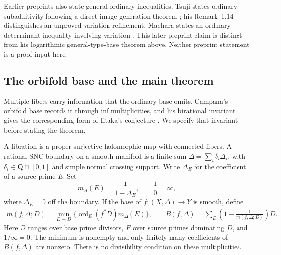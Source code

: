Earlier preprints also state general ordinary inequalities.
Tsuji states ordinary subadditivity following a direct-image generation
theorem \cite[Theorems~1.9 and~1.13]{TsujiDirectImages}; his
Remark~1.14 distinguishes an unproved variation refinement.
Maehara states an ordinary determinant inequality involving variation
\cite[\S7, Theorem~8]{MaeharaIitaka}. This later preprint claim is
distinct from his logarithmic general-type-base theorem above.
Neither preprint statement is a proof input here.

\subsection{The orbifold base and the main theorem}

Multiple fibers carry information that the ordinary base omits.
Campana's orbifold base records it through inf multiplicities, and
his birational invariant gives the corresponding form of Iitaka's
conjecture \cite{Campana2004,CampanaOrbifolds}. We specify that
invariant before stating the theorem.

\label{setup:orbifold-base}
A fibration is a proper surjective holomorphic map with connected
fibers. A rational SNC boundary on a smooth manifold is a finite
sum $\Delta=\sum_i\delta_i\Delta_i$, with
$\delta_i\in\mathbf Q\cap[0,1]$ and simple normal crossing support.
Write $\Delta_E$ for the coefficient of a source prime $E$. Set
\[
 m_\Delta(E)=\frac1{1-\Delta_E},
 \qquad \frac1{0}=\infty,
\]
where $\Delta_E=0$ off the boundary. If the base of
$f:(X,\Delta)\to Y$ is smooth, define
\begin{equation}\label{setup:inf-boundary}
\begin{gathered}
 m(f,\Delta;D)=\min_{E\mapsto D}
     \bigl\{\operatorname{ord}_E(f^*D)m_\Delta(E)\bigr\},
 \qquad
 B(f,\Delta)=\sum_D\left(1-\frac1{m(f,\Delta;D)}\right)D.
\end{gathered}
\end{equation}
Here $D$ ranges over base prime divisors, $E$ over source primes
dominating $D$, and $1/\infty=0$. The minimum is nonempty and
only finitely many coefficients of $B(f,\Delta)$ are nonzero.
There is no divisibility condition on these multiplicities.

